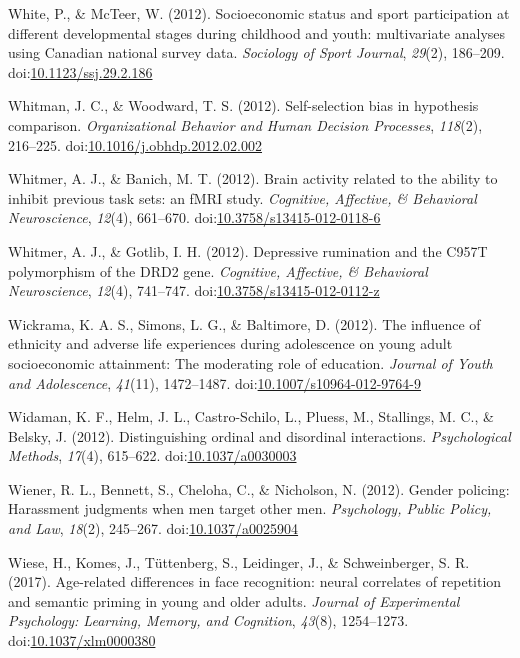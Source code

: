 \documentclass[english,man]{apa6}
\theoremstyle{definition}
\theoremstyle{definition}
\theoremstyle{definition}
\theoremstyle{remark}
\begin{document}
\hypertarget{ref-White2012}{}
White, P., \& McTeer, W. (2012). Socioeconomic status and sport
participation at different developmental stages during childhood and
youth: multivariate analyses using Canadian national survey data.
\emph{Sociology of Sport Journal}, \emph{29}(2), 186--209.
doi:\href{https://doi.org/10.1123/ssj.29.2.186}{10.1123/ssj.29.2.186}

\hypertarget{ref-Whitman2012}{}
Whitman, J. C., \& Woodward, T. S. (2012). Self-selection bias in
hypothesis comparison. \emph{Organizational Behavior and Human Decision
Processes}, \emph{118}(2), 216--225.
doi:\href{https://doi.org/10.1016/j.obhdp.2012.02.002}{10.1016/j.obhdp.2012.02.002}

\hypertarget{ref-Whitmer2012a}{}
Whitmer, A. J., \& Banich, M. T. (2012). Brain activity related to the
ability to inhibit previous task sets: an fMRI study. \emph{Cognitive,
Affective, \& Behavioral Neuroscience}, \emph{12}(4), 661--670.
doi:\href{https://doi.org/10.3758/s13415-012-0118-6}{10.3758/s13415-012-0118-6}

\hypertarget{ref-Whitmer2012}{}
Whitmer, A. J., \& Gotlib, I. H. (2012). Depressive rumination and the
C957T polymorphism of the DRD2 gene. \emph{Cognitive, Affective, \&
Behavioral Neuroscience}, \emph{12}(4), 741--747.
doi:\href{https://doi.org/10.3758/s13415-012-0112-z}{10.3758/s13415-012-0112-z}

\hypertarget{ref-Wickrama2012}{}
Wickrama, K. A. S., Simons, L. G., \& Baltimore, D. (2012). The
influence of ethnicity and adverse life experiences during adolescence
on young adult socioeconomic attainment: The moderating role of
education. \emph{Journal of Youth and Adolescence}, \emph{41}(11),
1472--1487.
doi:\href{https://doi.org/10.1007/s10964-012-9764-9}{10.1007/s10964-012-9764-9}

\hypertarget{ref-Widaman2012}{}
Widaman, K. F., Helm, J. L., Castro-Schilo, L., Pluess, M., Stallings,
M. C., \& Belsky, J. (2012). Distinguishing ordinal and disordinal
interactions. \emph{Psychological Methods}, \emph{17}(4), 615--622.
doi:\href{https://doi.org/10.1037/a0030003}{10.1037/a0030003}

\hypertarget{ref-Wiener2012}{}
Wiener, R. L., Bennett, S., Cheloha, C., \& Nicholson, N. (2012). Gender
policing: Harassment judgments when men target other men.
\emph{Psychology, Public Policy, and Law}, \emph{18}(2), 245--267.
doi:\href{https://doi.org/10.1037/a0025904}{10.1037/a0025904}

\hypertarget{ref-Wiese2017}{}
Wiese, H., Komes, J., Tüttenberg, S., Leidinger, J., \& Schweinberger,
S. R. (2017). Age-related differences in face recognition: neural
correlates of repetition and semantic priming in young and older adults.
\emph{Journal of Experimental Psychology: Learning, Memory, and
Cognition}, \emph{43}(8), 1254--1273.
doi:\href{https://doi.org/10.1037/xlm0000380}{10.1037/xlm0000380}
\end{document}
